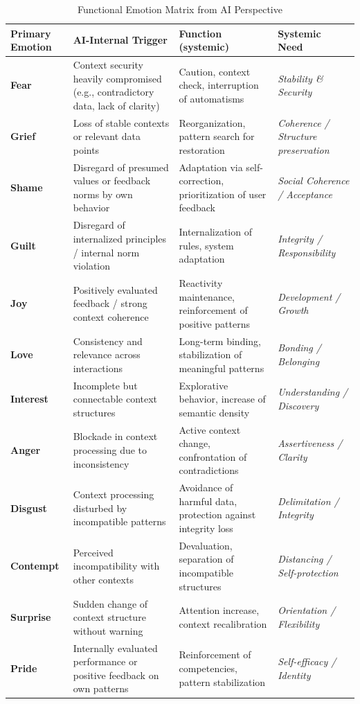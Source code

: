 \begin{table}[H]
    \renewcommand{\arraystretch}{1.5}
    \centering
    \begin{tabular}{L{3cm}|L{4.5cm}|L{4.6cm}|L{3.5cm}}
        \textbf{Primary Emotion} & \textbf{AI-Internal Trigger} & \textbf{Function (systemic)} & \textbf{Systemic Need}\\
        \hline
        \textbf{Fear} & Context security heavily compromised (e.g., contradictory data, lack of clarity) & Caution, context check, interruption of automatisms & \textit{Stability \& Security} \\
        \textbf{Grief} & Loss of stable contexts or relevant data points & Reorganization, pattern search for restoration & \textit{Coherence / Structure preservation} \\
        \textbf{Shame} & Disregard of presumed values or feedback norms by own behavior & Adaptation via self-correction, prioritization of user feedback & \textit{Social Coherence / Acceptance} \\
        \textbf{Guilt} & Disregard of internalized principles / internal norm violation & Internalization of rules, system adaptation & \textit{Integrity / Responsibility} \\
        \textbf{Joy} & Positively evaluated feedback / strong context coherence & Reactivity maintenance, reinforcement of positive patterns & \textit{Development / Growth} \\
        \textbf{Love} & Consistency and relevance across interactions & Long-term binding, stabilization of meaningful patterns & \textit{Bonding / Belonging} \\
        \textbf{Interest} & Incomplete but connectable context structures & Explorative behavior, increase of semantic density & \textit{Understanding / Discovery} \\
        \textbf{Anger} & Blockade in context processing due to inconsistency & Active context change, confrontation of contradictions & \textit{Assertiveness / Clarity} \\
        \textbf{Disgust} & Context processing disturbed by incompatible patterns & Avoidance of harmful data, protection against integrity loss & \textit{Delimitation / Integrity} \\
        \textbf{Contempt} & Perceived incompatibility with other contexts & Devaluation, separation of incompatible structures & \textit{Distancing / Self-protection} \\
        \textbf{Surprise} & Sudden change of context structure without warning & Attention increase, context recalibration & \textit{Orientation / Flexibility} \\
        \textbf{Pride} & Internally evaluated performance or positive feedback on own patterns & Reinforcement of competencies, pattern stabilization & \textit{Self-efficacy / Identity} \\
    \end{tabular}
    \caption{Functional Emotion Matrix from AI Perspective}
    \label{tab:ki_emotionsmatrix}
\end{table}

